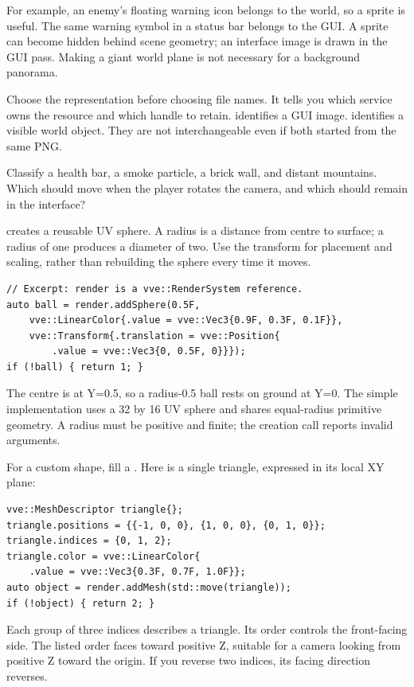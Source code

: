 \documentclass[11pt,a4paper]{article}
\begin{document}
For example, an enemy's floating warning icon belongs to the world, so a sprite is useful. The same warning symbol in a status bar belongs to the GUI. A sprite can become hidden behind scene geometry; an interface image is drawn in the GUI pass. Making a giant world plane is not necessary for a background panorama.

Choose the representation before choosing file names. It tells you which service owns the resource and which handle to retain.  identifies a GUI image.  identifies a visible world object. They are not interchangeable even if both started from the same PNG.

\begin{tryit}Classify a health bar, a smoke particle, a brick wall, and distant mountains. Which should move when the player rotates the camera, and which should remain in the interface?\end{tryit}

 creates a reusable UV sphere. A radius is a distance from centre to surface; a radius of one produces a diameter of two. Use the transform for placement and scaling, rather than rebuilding the sphere every time it moves.
\begin{lstlisting}
// Excerpt: render is a vve::RenderSystem reference.
auto ball = render.addSphere(0.5F,
    vve::LinearColor{.value = vve::Vec3{0.9F, 0.3F, 0.1F}},
    vve::Transform{.translation = vve::Position{
        .value = vve::Vec3{0, 0.5F, 0}}});
if (!ball) { return 1; }
\end{lstlisting}
The centre is at Y=0.5, so a radius-0.5 ball rests on ground at Y=0. The simple implementation uses a 32 by 16 UV sphere and shares equal-radius primitive geometry. A radius must be positive and finite; the creation call reports invalid arguments.

For a custom shape, fill a . Here is a single triangle, expressed in its local XY plane:
\begin{lstlisting}
vve::MeshDescriptor triangle{};
triangle.positions = {{-1, 0, 0}, {1, 0, 0}, {0, 1, 0}};
triangle.indices = {0, 1, 2};
triangle.color = vve::LinearColor{
    .value = vve::Vec3{0.3F, 0.7F, 1.0F}};
auto object = render.addMesh(std::move(triangle));
if (!object) { return 2; }
\end{lstlisting}
Each group of three indices describes a triangle. Its order controls the front-facing side. The listed order faces toward positive Z, suitable for a camera looking from positive Z toward the origin. If you reverse two indices, its facing direction reverses.
\end{document}
